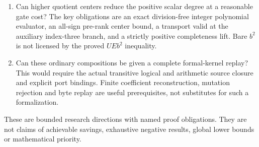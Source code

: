 \begin{enumerate}
not a relabelled inherited source theorem.
\item Can higher quotient centers reduce the positive scalar degree at a
reasonable gate cost? The key obligations are an exact division-free integer
polynomial evaluator, an all-sign pre-rank center bound, a transport valid
at the auxiliary index-three branch, and a strictly positive completeness
lift. Bare $b^2$ is not licensed by the proved $UEb^2$ inequality.
\item Can these ordinary compositions be given a complete formal-kernel
replay? This would require the actual transitive logical and arithmetic
source closure and explicit port bindings. Finite coefficient reconstruction,
mutation rejection and byte replay are useful prerequisites, not substitutes
for such a formalization.
\end{enumerate}
These are bounded research directions with named proof obligations. They are
not claims of achievable savings, exhaustive negative results, global lower
bounds or mathematical priority.
